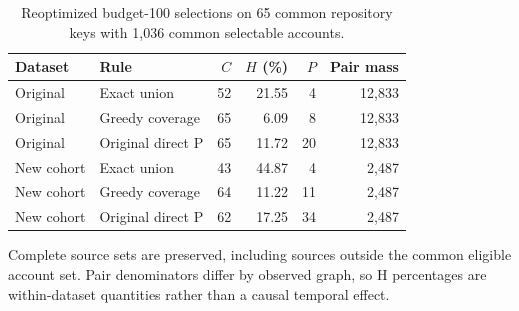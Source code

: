 \begin{table}[t]
\centering
\footnotesize
\caption{Reoptimized budget-100 selections on 65 common repository keys with 1,036 common selectable accounts.}
\label{tab:revision_common}
\begin{tabular}{llrrrr}
\toprule
Dataset & Rule & $C$ & $H$ (\%) & $P$ & Pair mass\\
\midrule
Original & Exact union & 52 & 21.55 & 4 & 12,833\\
Original & Greedy coverage & 65 & 6.09 & 8 & 12,833\\
Original & Original direct P & 65 & 11.72 & 20 & 12,833\\
New cohort & Exact union & 43 & 44.87 & 4 & 2,487\\
New cohort & Greedy coverage & 64 & 11.22 & 11 & 2,487\\
New cohort & Original direct P & 62 & 17.25 & 34 & 2,487\\
\bottomrule
\end{tabular}
\par\smallskip\begin{minipage}{0.98\textwidth}\footnotesize Complete source sets are preserved, including sources outside the common eligible account set. Pair denominators differ by observed graph, so H percentages are within-dataset quantities rather than a causal temporal effect.\end{minipage}
\end{table}
